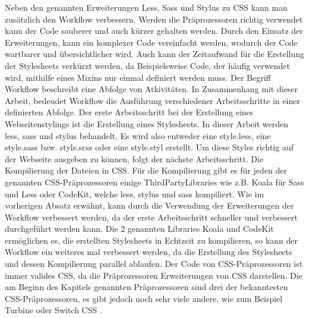 Neben den genannten Erweiterungen Less, Sass und Stylus zu CSS kann man zusätzlich den Workflow verbessern. Werden die Präprozessoren richtig verwendet kann der Code sauberer und auch kürzer gehalten werden.\newline
Durch den Einsatz der Erweiterungen, kann ein komplexer Code vereinfacht werden, wodurch der Code wartbarer und übersichtlicher wird. Auch kann der Zeitaufwand für die Erstellung der Stylesheets verkürzt werden, da Beispielsweise Code, der häufig verwendet wird, mithilfe eines Mixins nur einmal definiert werden muss.\newline\newline
Der Begriff Workflow beschreibt eine Abfolge von Atkivitäten. In Zusammenhang mit dieser Arbeit, bedeudet Workflow die Ausführung verschiedener Arbeitsschritte in einer definierten Abfolge.\newline
Der erste Arbeitsschritt bei der Erstellung eines Webseitenstylings ist die Erstellung eines Stylesheets. In dieser Arbeit werden less, sass und stylus behandelt. Es wird also entweder eine style.less, eine style.sass bzw. style.scss oder eine style.styl erstellt. \newline
Um diese Styles richtig auf der Webseite ausgeben zu können, folgt der nächste Arbeitsschritt. Die Kompilierung der Dateien in CSS.\newline
Für die Kompilierung gibt es für jeden der genannten CSS-Präprozessoren einige ThirdPartyLibraries wie z.B. Koala für Sass und Less oder CodeKit, welche less, stylus und sass kompiliert. \newline
Wie im vorherigen Absatz erwähnt, kann durch die Verwendung der Erweiterungen der Workflow verbessert werden, da der erste Arbeitsschritt schneller und verbessert durchgeführt werden kann. \newline
Die 2 genannten Libraries Koala und CodeKit ermöglichen es, die erstellten Stylesheets in Echtzeit zu kompilieren, so kann der Workflow ein weiteres mal verbessert werden, da die Erstellung des Stylesheets und dessen Kompilierung parallel ablaufen.\newline\newline
Der Code von CSS-Präprozessoren ist immer valides CSS, da die Präprozessoren Erweiterungen von CSS darstellen. Die am Beginn des Kapitels genannten Präprozessoren sind drei der bekanntesten CSS-Präprozessoren, es gibt jedoch noch sehr viele andere, wie zum Beispiel Turbine oder Switch CSS \autocite[]{Jung.2010}.


